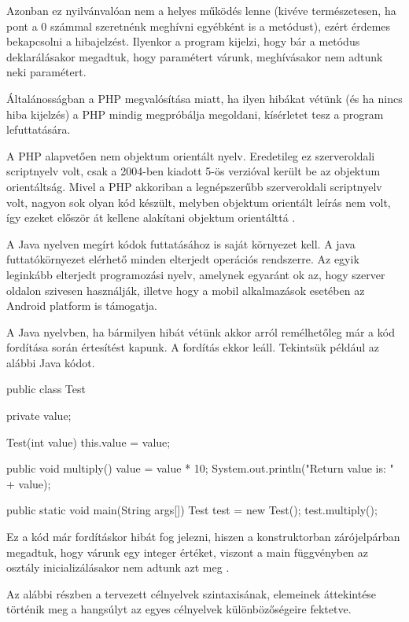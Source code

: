 Azonban ez nyilvánvalóan nem a helyes működés lenne (kivéve természetesen, ha pont a 0 számmal szeretnénk meghívni egyébként is a metódust), ezért érdemes bekapcsolni a hibajelzést. Ilyenkor a program kijelzi, hogy bár a metódus deklarálásakor megadtuk, hogy paramétert várunk, meghívásakor nem adtunk neki paramétert.

Általánosságban a PHP megvalósítása miatt, ha ilyen hibákat vétünk (és ha nincs hiba kijelzés) a PHP mindig megpróbálja megoldani, kísérletet tesz a program lefuttatására.

A PHP alapvetően nem objektum orientált nyelv. Eredetileg ez szerveroldali scriptnyelv volt, csak a 2004-ben kiadott 5-ös verzióval került be az objektum orientáltság. Mivel a PHP akkoriban a legnépszerűbb szerveroldali scriptnyelv volt, nagyon sok olyan kód készült, melyben objektum orientált leírás nem volt, így ezeket először át kellene alakítani objektum orientálttá \cite{php}.


A Java nyelven megírt kódok futtatásához is saját környezet kell. A java futtatókörnyezet elérhető minden elterjedt operációs rendszerre. Az egyik leginkább elterjedt programozási nyelv, amelynek egyaránt ok az, hogy szerver oldalon szivesen használják, illetve hogy a mobil alkalmazások esetében az Android platform is támogatja.

A Java nyelvben, ha bármilyen hibát vétünk akkor arról remélhetőleg már a kód fordítása során értesítést kapunk. A fordítás ekkor leáll. Tekintsük például az alábbi Java kódot.
\begin{java}
public class Test {
    private value;
    
    Test(int value) {
        this.value = value;
    }

   public void multiply() {
      value = value * 10;
      System.out.println("Return value is: " + value);
   }

   public static void main(String args[]) {
      Test test = new Test();
      test.multiply();
   }
}
\end{java}

Ez a kód már fordításkor hibát fog jelezni, hiszen a konstruktorban zárójelpárban megadtuk, hogy várunk egy integer értéket, viszont a main függvényben az osztály inicializálásakor nem adtunk azt meg \cite{java}. 


Az alábbi részben a tervezett célnyelvek szintaxisának, elemeinek áttekintése történik meg a hangsúlyt az egyes célnyelvek különbözőségeire fektetve.

